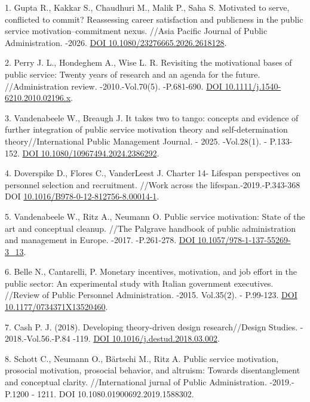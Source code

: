 \begin{refs}
1. Gupta R., Kakkar S., Chaudhuri M., Malik P., Saha S. Motivated to
serve, conflicted to commit? Reassessing career satisfaction and
publicness in the public service motivation--commitment nexus. //Asia
Pacific Journal of Public Administration. -2026.
\href{https://doi.org/10.1080/23276665.2026.2618128}{DOI
10.1080/23276665.2026.2618128}.

2. Perry J. L., Hondeghem A., Wise L. R. Revisiting the motivational
bases of public service: Twenty years of research and an agenda for the
future. //Administration review. -2010.-Vol.70(5). -P.681-690.
\href{https://doi.org/10.1111/j.1540-6210.2010.02196.x}{DOI
10.1111/j.1540-6210.2010.02196.x}.

3. Vandenabeele W., Breaugh J. It takes two to tango: concepts and
evidence of further integration of public service motivation theory and
self-determination theory//International Public Management Journal. -
2025. -Vol.28(1). - P.133-152.
\href{https://doi.org/10.1080/10967494.2024.2386292}{DOI
10.1080/10967494.2024.2386292}.

4. Doverspike D., Flores C., VanderLeest J. Charter 14- Lifespan
perspectives on personnel selection and recruitment. //Work across the
lifespan.-2019.-P.343-368 DOI
\href{https://doi.org/10.1016/B978-0-12-812756-8.00014-1}{10.1016/B978-0-12-812756-8.00014-1}.

5. Vandenabeele W., Ritz A., Neumann O. Public service motivation: State
of the art and conceptual cleanup. //The Palgrave handbook of public
administration and management in Europe. -2017. -P.261-278.
\href{https://doi.org/10.1057/978-1-137-55269-3_13}{DOI
10.1057/978-1-137-55269-3\_13}.

6. Belle N., Cantarelli, P. Monetary incentives, motivation, and job
effort in the public sector: An experimental study with Italian
government executives. //Review of Public Personnel Administration.
-2015. Vol.35(2). - P.99-123.
\href{https://doi.org/10.1177/0734371X13520460}{DOI
10.1177/0734371X13520460}.

7. Cash P. J. (2018). Developing theory-driven design research//Design
Studies. - 2018.-Vol.56.-P.84 -119.
\href{https://doi.org/10.1016/j.destud.2018.03.002}{DOI
10.1016/j.destud.2018.03.002}.

8. Schott C., Neumann O., Bärtschi M., Ritz A. Public service motivation,
prosocial motivation, prosocial behavior, and altruism: Towards
disentanglement and conceptual clarity. //International
jurnal of Public Administration. -2019.- P.1200 - 1211. DOI
10.1080.01900692.2019.1588302.


\end{refs}
